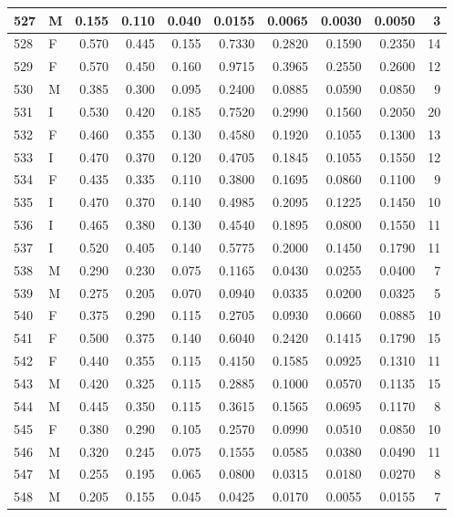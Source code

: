 \documentclass[9pt,twocolumn,twoside,]{pnas-new}
\begin{document}
\begin{tabular}{l|l|r|r|r|r|r|r|r|r}
\hline
527 & M & 0.155 & 0.110 & 0.040 & 0.0155 & 0.0065 & 0.0030 & 0.0050 & 3\\
\hline
528 & F & 0.570 & 0.445 & 0.155 & 0.7330 & 0.2820 & 0.1590 & 0.2350 & 14\\
\hline
529 & F & 0.570 & 0.450 & 0.160 & 0.9715 & 0.3965 & 0.2550 & 0.2600 & 12\\
\hline
530 & M & 0.385 & 0.300 & 0.095 & 0.2400 & 0.0885 & 0.0590 & 0.0850 & 9\\
\hline
531 & I & 0.530 & 0.420 & 0.185 & 0.7520 & 0.2990 & 0.1560 & 0.2050 & 20\\
\hline
532 & F & 0.460 & 0.355 & 0.130 & 0.4580 & 0.1920 & 0.1055 & 0.1300 & 13\\
\hline
533 & I & 0.470 & 0.370 & 0.120 & 0.4705 & 0.1845 & 0.1055 & 0.1550 & 12\\
\hline
534 & F & 0.435 & 0.335 & 0.110 & 0.3800 & 0.1695 & 0.0860 & 0.1100 & 9\\
\hline
535 & I & 0.470 & 0.370 & 0.140 & 0.4985 & 0.2095 & 0.1225 & 0.1450 & 10\\
\hline
536 & I & 0.465 & 0.380 & 0.130 & 0.4540 & 0.1895 & 0.0800 & 0.1550 & 11\\
\hline
537 & I & 0.520 & 0.405 & 0.140 & 0.5775 & 0.2000 & 0.1450 & 0.1790 & 11\\
\hline
538 & M & 0.290 & 0.230 & 0.075 & 0.1165 & 0.0430 & 0.0255 & 0.0400 & 7\\
\hline
539 & M & 0.275 & 0.205 & 0.070 & 0.0940 & 0.0335 & 0.0200 & 0.0325 & 5\\
\hline
540 & F & 0.375 & 0.290 & 0.115 & 0.2705 & 0.0930 & 0.0660 & 0.0885 & 10\\
\hline
541 & F & 0.500 & 0.375 & 0.140 & 0.6040 & 0.2420 & 0.1415 & 0.1790 & 15\\
\hline
542 & F & 0.440 & 0.355 & 0.115 & 0.4150 & 0.1585 & 0.0925 & 0.1310 & 11\\
\hline
543 & M & 0.420 & 0.325 & 0.115 & 0.2885 & 0.1000 & 0.0570 & 0.1135 & 15\\
\hline
544 & M & 0.445 & 0.350 & 0.115 & 0.3615 & 0.1565 & 0.0695 & 0.1170 & 8\\
\hline
545 & F & 0.380 & 0.290 & 0.105 & 0.2570 & 0.0990 & 0.0510 & 0.0850 & 10\\
\hline
546 & M & 0.320 & 0.245 & 0.075 & 0.1555 & 0.0585 & 0.0380 & 0.0490 & 11\\
\hline
547 & M & 0.255 & 0.195 & 0.065 & 0.0800 & 0.0315 & 0.0180 & 0.0270 & 8\\
\hline
548 & M & 0.205 & 0.155 & 0.045 & 0.0425 & 0.0170 & 0.0055 & 0.0155 & 7\\

\end{tabular}
\end{document}
